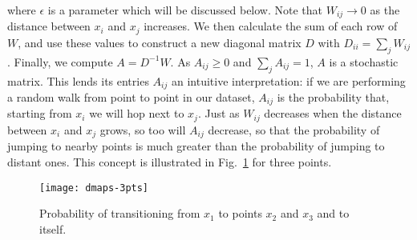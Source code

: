 where $\epsilon$ is a parameter which will be discussed below. Note
that $W_{ij} \rightarrow 0$ as the distance between $x_i$ and $x_j$
increases. We then calculate the sum of each row of $W$, and use these
values to construct a new diagonal matrix $D$ with
$D_{ii} = \sum_j W_{ij}$. Finally, we compute $A = D^{-1} W$. As
$A_{ij} \ge 0$ and $\sum_j A_{ij} = 1$, $A$ is a stochastic
matrix. This lends its entries $A_{ij}$ an intuitive interpretation:
if we are performing a random walk from point to point in our dataset,
$A_{ij}$ is the probability that, starting from $x_i$ we will hop next
to $x_j$. Just as $W_{ij}$ decreases when the distance between $x_i$
and $x_j$ grows, so too will $A_{ij}$ decrease, so that the
probability of jumping to nearby points is much greater than the
probability of jumping to distant ones. This concept is illustrated in
Fig.~\ref{fig:dmaps-3pts} for three points.

\begin{figure}
  \centering
  \texttt{[image: dmaps-3pts]}
  \caption{Probability of transitioning from $x_1$ to points $x_2$ and
    $x_3$ and to itself. \label{fig:dmaps-3pts}}
\end{figure}
